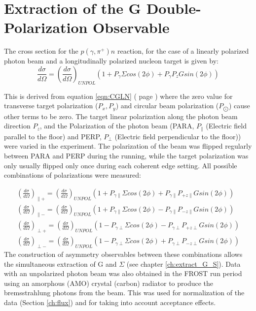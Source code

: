 \section{Extraction of the G Double-Polarization Observable} \label{ch:extract_G}
The cross section for the $p(\gamma,\pi^+)n$ reaction, for the case of a linearly polarized photon beam and a longitudinally polarized nucleon target is given by:
\begin{equation}
  \frac{d\sigma}{d\Omega} = \left(\frac{d\sigma}{d\Omega}\right)_{UNPOL}  \left( 1 + P_{\gamma}\Sigma cos(2\phi) + P_{\gamma} P_z G sin(2\phi) \right)
  \label{eqn:extract_G_S}
\end{equation}

This is derived from equation \ref{eqn:CGLN} ( page \pageref{eqn:CGLN}) where the zero value for transverse target polarization ($P_x , P_y$) and circular beam polarization ($P_{\bigodot}$) cause other terms to be zero. The target linear polarization along the photon beam direction $P_z$, and the Polarization of the photon beam (PARA, $P_{\parallel}$ (Electric field parallel to the floor) and PERP, $P_{\perp}$ (Electric field perpendicular to the floor)) were varied in the experiment. The polarization of the beam was flipped regularly between PARA and PERP during the running, while the target polarization was only usually flipped only once during each coherent edge setting. All possible combinations of polarizations were measured:

\begin{eqnarray}
\left(\frac{d\sigma}{d\Omega}\right)_{\parallel +} = \left(\frac{d\sigma}{d\Omega}\right)_{UNPOL}  \left( 1 + P_{\gamma \parallel}\Sigma cos(2\phi) + P_{\gamma \parallel} P_{+z\parallel} G sin(2\phi) \right) \\
\left(\frac{d\sigma}{d\Omega}\right)_{\parallel -} = \left(\frac{d\sigma}{d\Omega}\right)_{UNPOL}  \left( 1 + P_{\gamma \parallel}\Sigma cos(2\phi) - P_{\gamma \parallel} P_{-z\parallel} G sin(2\phi) \right) \\
\left(\frac{d\sigma}{d\Omega}\right)_{\perp +} = \left(\frac{d\sigma}{d\Omega}\right)_{UNPOL}  \left( 1 - P_{\gamma \perp}\Sigma cos(2\phi) - P_{\gamma \perp} P_{+z\perp} G sin(2\phi) \right) \\
\left(\frac{d\sigma}{d\Omega}\right)_{\perp -} = \left(\frac{d\sigma}{d\Omega}\right)_{UNPOL}  \left( 1 - P_{\gamma \perp}\Sigma cos(2\phi) + P_{\gamma \perp} P_{-z\perp} G sin(2\phi) \right)
\end{eqnarray}
The construction of asymmetry observables between these combinations allows the simultaneous extraction of G and $\Sigma$ (see chapter \ref{ch:extract_G_S}). Data with an unpolarized photon beam was also obtained in the FROST run period using an amorphous (AMO) crystal (carbon) radiator to produce the bremsstrahlung photons from the beam. This was used for normalization of the data (Section \ref{ch:flux}) and for taking into account acceptance effects. 

